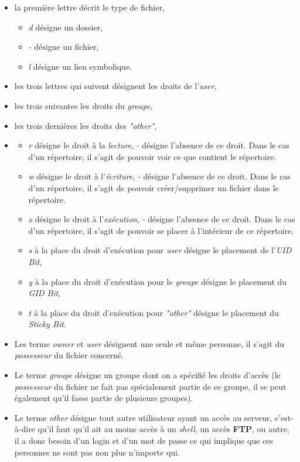 \documentclass{article}
\newcommand{\term}[1]{\textit{\textcolor{maintitle}{#1}}}
\begin{document}
\begin{sffamily}
\renewcommand{\labelitemii}{$\rightarrow$}

\begin{itemize}
\item la première lettre décrit le type de fichier, 
	\begin{itemize}
	\item \term{d} désigne un dossier,
	\item \term{-} désigne un fichier,
	\item \term{l} désigne un lien symbolique.
	\end{itemize}
\item les trois lettres qui suivent désignent les droits de l'\term{user},
\item les trois suivantes les droits du \term{groupe},
\item les trois dernières les droits des \textit{"\term{other}"},
\item \begin{itemize}
		\item \term{r} désigne le droit à la \term{lecture}, \term{-} désigne l'absence de ce droit. Dans le cas d'un
		répertoire, il s'agit de pouvoir voir ce que contient le répertoire.
		\item \term{w} désigne le droit à l'\term{écriture}, \term{-} désigne l'absence de ce droit. Dans le cas d'un
		répertoire, il s'agit de pouvoir créer/supprimer un fichier dans le répertoire.
		\item \term{x} désigne le droit à l'\term{exécution}, \term{-} désigne l'absence de ce droit. Dans le cas d'un
		répertoire, il s'agit de pouvoir se placer à l'intérieur de ce répertoire.
		\item \term{s} à la place du droit d'exécution pour \term{user} désigne le placement de l'\term{UID Bit},
		\item \term{g} à la place du droit d'exécution pour le \term{groupe} désigne le placement du \term{GID Bit},
		\item \term{t} à la place du droit d'exécution pour \textit{"\term{other}"} désigne le placement du 
		\term{Sticky Bit}.
	  \end{itemize}
\end{itemize}

\begin{itemize}
\item Les terme \term{owner} et \term{user} désignent une seule et même personne, il s'agit du \term{possesseur} du 
fichier concerné.
\item Le terme \term{groupe} désigne un groupe dont on a spécifié les droits d'accès (le \term{possesseur} du 
fichier ne fait pas spécialement partie de ce groupe, il se peut également qu'il fasse partie de plusieurs groupes). 
\item Le terme \term{other} désigne tout autre utilisateur ayant un accès au serveur, c'est-à-dire qu'il faut qu'il ait 
au moins accès à un \textit{shell}, un accès \textbf{FTP}, ou autre, il a donc besoin d'un login et d'un mot de passe 
ce qui implique que ces personnes ne sont pas non plus n'importe qui.
\end{itemize}


\end{sffamily}
\end{document}
